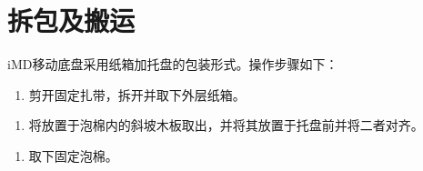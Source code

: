 \documentclass[a4paper,11pt,english,openany,oneside]{sphinxmanual}
\begin{document}
\section{拆包及搬运}
\label{\detokenize{08 _u5b89_u88c5_u4e0e_u8c03_u8bd5:id9}}\label{\detokenize{08 _u5b89_u88c5_u4e0e_u8c03_u8bd5:id10}}
\sphinxAtStartPar
iM\sphinxhyphen{}D移动底盘采用纸箱加托盘的包装形式。操作步骤如下：
\begin{enumerate}
%
\item {} 
\sphinxAtStartPar
剪开固定扎带，拆开并取下外层纸箱。
\begin{quote}

\begin{figure}[H]
\centering

\noindent{}
\end{figure}

\begin{figure}[H]
\centering

\noindent{}
\end{figure}
\end{quote}

\end{enumerate}


\begin{enumerate}
%
\setcounter{enumi}{1}
\item {} 
\sphinxAtStartPar
将放置于泡棉内的斜坡木板取出，并将其放置于托盘前并将二者对齐。
\begin{quote}

\begin{figure}[H]
\centering

\noindent{}
\end{figure}
\end{quote}

\end{enumerate}


\begin{enumerate}
%
\setcounter{enumi}{2}
\item {} 
\sphinxAtStartPar
取下固定泡棉。
\begin{quote}

\begin{figure}[H]
\centering

\noindent{}
\end{figure}
\end{quote}

\end{enumerate}
\end{document}
